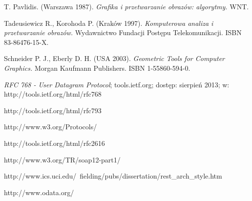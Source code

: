 \begin{thebibliography}{}

  T. Pavlidis.
  (Warszawa 1987).
  \emph{Grafika i przetwarzanie obrazów: algorytmy.}
  WNT.

  Tadeusiewicz R., Korohoda P.
  (Kraków 1997).
  \emph{Komputerowa analiza i przetwarzanie obrazów.}
  Wydawnictwo Fundacji Postępu Telekomunikacji.
  ISBN 83-86476-15-X.

  Schneider P. J., Eberly D. H.
  (USA 2003).
  \emph{Geometric Tools for Computer Graphics.}
  Morgan Kaufmann Publishers.
  ISBN 1-55860-594-0.
  
  \emph{RFC 768 - User Datagram Protocol};
  tools.ietf.org;
  dostęp: sierpień 2013;
  w: http://tools.ietf.org/html/rfc768
 
  http://tools.ietf.org/html/rfc793
 
  http://www.w3.org/Protocols/
 
  http://tools.ietf.org/html/rfc2616
 
  http://www.w3.org/TR/soap12-part1/
 
  http://www.ics.uci.edu/~fielding/pubs/dissertation/rest\_arch\_style.htm
 
  http://www.odata.org/
                
\end{thebibliography}
